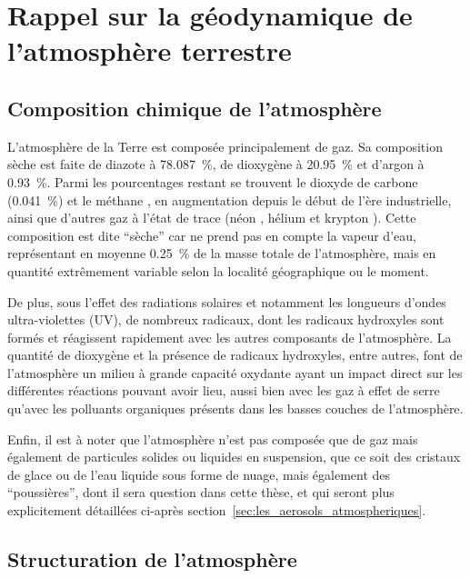 
\section{Rappel sur la géodynamique de l'atmosphère terrestre}%
\label{sec:structure_atmosphere}

\subsection{Composition chimique de l'atmosphère}%
\label{ssub:composition_chimique_de_latmosphere}

L'atmosphère de la Terre est composée principalement de gaz. Sa composition sèche est
faite de diazote  à \SI{78.087}{\percent}, de dioxygène  à
\SI{20.95}{\percent} et d'argon  à \SI{0.93}{\percent}. Parmi les pourcentages restant
se trouvent le dioxyde de carbone  (\SI{0.041}{\percent}) et le méthane ,
en augmentation depuis le début de l'ère industrielle, ainsi que d'autres gaz à
l'état de trace (néon , hélium  et krypton ).  Cette composition est
dite ``sèche'' car ne prend pas en compte la vapeur d'eau, représentant en moyenne 
\SI{0.25}{\percent} de la masse totale de l'atmosphère, mais en quantité extrêmement
variable selon la localité géographique ou le moment.

De plus, sous l'effet des radiations solaires et notamment les longueurs d'ondes
ultra-violettes (UV), de nombreux radicaux, dont les radicaux hydroxyles  sont formés et réagissent
rapidement avec les autres composants de l'atmosphère.  La quantité de dioxygène et la
présence de radicaux hydroxyles, entre autres, font de l'atmosphère un milieu à grande
capacité oxydante ayant un impact direct sur les différentes réactions pouvant avoir lieu,
aussi bien avec les gaz à effet de serre qu'avec les polluants organiques présents dans
les basses couches de l'atmosphère.

Enfin, il est à noter que l'atmosphère n'est pas composée que de gaz mais également de
particules solides ou liquides en suspension, que ce soit des cristaux de glace ou de l'eau
liquide sous forme de nuage, mais également des ``poussières'', dont il sera question dans
cette thèse, et qui seront plus explicitement détaillées ci-après
section~\ref{sec:les_aerosols_atmospheriques}.

\subsection{Structuration de l'atmosphère}%
\label{sub:structuration_de_l_atmosphere}

